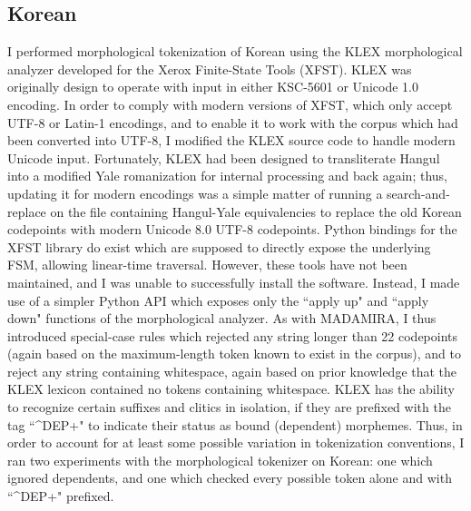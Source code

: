 \subsection{Korean}
I performed morphological tokenization of Korean using the KLEX morphological analyzer developed for the Xerox Finite-State Tools (XFST). KLEX was originally design to operate with input in either KSC-5601 or Unicode 1.0 encoding. In order to comply with modern versions of XFST, which only accept UTF-8 or Latin-1 encodings, and to enable it to work with the corpus which had been converted into UTF-8, I modified the KLEX source code to handle modern Unicode input. Fortunately, KLEX had been designed to transliterate Hangul into a modified Yale romanization for internal processing and back again; thus, updating it for modern encodings was a simple matter of running a search-and-replace on the file containing Hangul-Yale equivalencies to replace the old Korean codepoints with modern Unicode 8.0 UTF-8 codepoints.
Python bindings for the XFST library do exist which are supposed to directly expose the underlying FSM, allowing linear-time traversal. However, these tools have not been maintained, and I was unable to successfully install the software. Instead, I made use of a simpler Python API which exposes only the ``apply up" and ``apply down" functions of the morphological analyzer. As with MADAMIRA, I thus introduced special-case rules which rejected any string longer than 22 codepoints (again based on the maximum-length token known to exist in the corpus), and to reject any string containing whitespace, again based on prior knowledge that the KLEX lexicon contained no tokens containing whitespace.
KLEX has the ability to recognize certain suffixes and clitics in isolation, if they are prefixed with the tag ``\^{}DEP+" to indicate their status as bound (dependent) morphemes. Thus, in order to account for at least some possible variation in tokenization conventions, I ran two experiments with the morphological tokenizer on Korean: one which ignored dependents, and one which checked every possible token alone and with ``\^{}DEP+" prefixed.

